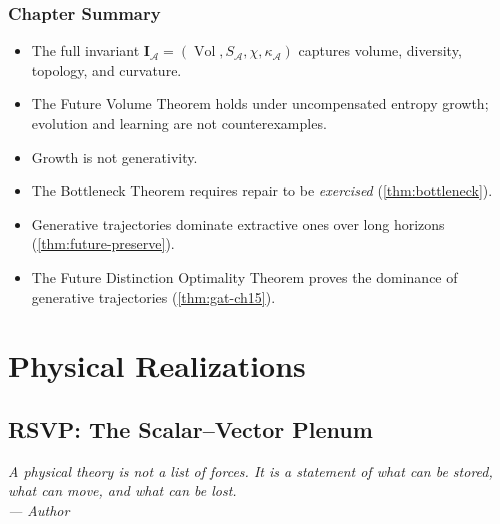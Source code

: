 \documentclass[12pt,twoside,openright]{book}
\newcommand{\adm}{\mathcal{A}}
\newcommand{\Vol}{\operatorname{Vol}}
\newenvironment{epigraph}[2]{%
  \vspace{1em}\begin{flushright}
  \begin{minipage}{0.72\textwidth}
  \itshape\small #1\\[0.4em]
  \upshape\footnotesize\sffamily\color{DistGray}--- #2
  \end{minipage}\end{flushright}\vspace{1.5em}}{}
\newenvironment{chapsummary}{%
  \begin{tcolorbox}[colback=DistBlue!5,colframe=DistBlue,
    title={\faBookOpen\enspace Summary},
    fonttitle=\sffamily\bfseries\color{white},
    attach boxed title to top left={yshift=-2mm,xshift=4mm},
    boxed title style={colback=DistBlue,rounded corners}]
  \begin{itemize}[nosep,leftmargin=*]}{%
  \end{itemize}\end{tcolorbox}}
\newcounter{exercise}[chapter]
\begin{document}
\section*{Chapter Summary}
\begin{chapsummary}
  \item The full invariant
        $\mathbf{I}_\adm=(\Vol,S_\adm,\chi,\kappa_\adm)$
        captures volume, diversity, topology, and curvature.
  \item The Future Volume Theorem holds under uncompensated
        entropy growth; evolution and learning are not
        counterexamples.
  \item Growth is not generativity.
  \item The Bottleneck Theorem requires repair to be
        \emph{exercised} (\cref{thm:bottleneck}).
  \item Generative trajectories dominate extractive ones
        over long horizons (\cref{thm:future-preserve}).
  \item The Future Distinction Optimality Theorem proves
        the dominance of generative trajectories
        (\cref{thm:gat-ch15}).
\end{chapsummary}

\part{Physical Realizations}


\chapter{RSVP: The Scalar--Vector Plenum}
\label{ch:rsvp}

\begin{epigraph}{%
  A physical theory is not a list of forces. It is a
  statement of what can be stored, what can move, and
  what can be lost.}%
  {Author}
\end{epigraph}
\end{document}
